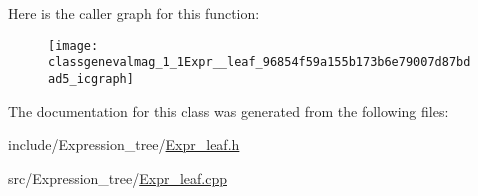Here is the caller graph for this function:\nopagebreak
\begin{figure}[H]
\begin{center}
\leavevmode
\texttt{[image: classgenevalmag\_1\_1Expr\_\_leaf\_96854f59a155b173b6e79007d87bdad5\_icgraph]}
\end{center}
\end{figure}


The documentation for this class was generated from the following files:\begin{CompactItemize}
\item 
include/Expression\_\-tree/\hyperlink{Expr__leaf_8h}{Expr\_\-leaf.h}\item 
src/Expression\_\-tree/\hyperlink{Expr__leaf_8cpp}{Expr\_\-leaf.cpp}\end{CompactItemize}
